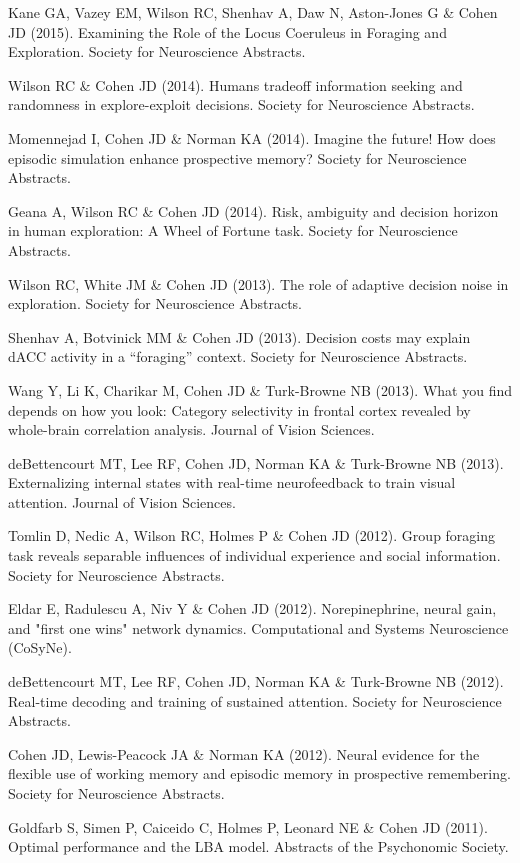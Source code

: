 \documentclass[10 pt]{article}
\begin{document}
Kane GA, Vazey EM, Wilson RC, Shenhav A, Daw N, Aston-Jones G \& Cohen JD (2015). Examining the Role of the Locus Coeruleus in Foraging and Exploration. Society for Neuroscience Abstracts.

Wilson RC \& Cohen JD (2014). Humans tradeoff information seeking and randomness in explore-exploit decisions. Society for Neuroscience Abstracts.

Momennejad I, Cohen JD \& Norman KA (2014). Imagine the future! How does episodic simulation enhance prospective memory? Society for Neuroscience Abstracts.

Geana A, Wilson RC \& Cohen JD (2014). Risk, ambiguity and decision horizon in human exploration: A Wheel of Fortune task. Society for Neuroscience Abstracts.

Wilson RC, White JM \& Cohen JD (2013). The role of adaptive decision noise in exploration. Society for Neuroscience Abstracts.

Shenhav A, Botvinick MM \& Cohen JD (2013). Decision costs may explain dACC activity in a “foraging” context. Society for Neuroscience Abstracts.

Wang Y, Li K, Charikar M, Cohen JD \& Turk-Browne NB (2013). What you find depends on how you look: Category selectivity in frontal cortex revealed by whole-brain correlation analysis. Journal of Vision Sciences.

deBettencourt MT, Lee RF, Cohen JD, Norman KA \& Turk-Browne NB (2013). Externalizing internal states with real-time neurofeedback to train visual attention. Journal of Vision Sciences.

Tomlin D, Nedic A, Wilson RC, Holmes P \& Cohen JD (2012). Group foraging task reveals separable influences of individual experience and social information. Society for Neuroscience Abstracts.

Eldar E, Radulescu A, Niv Y \& Cohen JD (2012). Norepinephrine, neural gain, and "first one wins" network dynamics. Computational and Systems Neuroscience (CoSyNe).

deBettencourt MT, Lee RF, Cohen JD, Norman KA \& Turk-Browne NB (2012). Real-time decoding and training of sustained attention. Society for Neuroscience Abstracts.

Cohen JD, Lewis-Peacock JA \& Norman KA (2012). Neural evidence for the flexible use of working memory and episodic memory in prospective remembering. Society for Neuroscience Abstracts.

Goldfarb S, Simen P, Caiceido C, Holmes P, Leonard NE \& Cohen JD (2011). Optimal performance and the LBA model. Abstracts of the Psychonomic Society.
\end{document}
